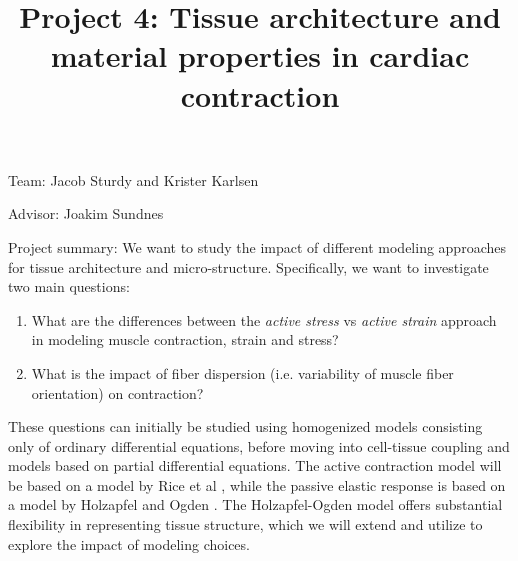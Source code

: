 \documentclass[epsfig,11pt]{article}
\title{Project 4: Tissue architecture and material properties in cardiac contraction}
\begin{document}
\maketitle

\begin{description}
\item{Team:} Jacob Sturdy and Krister Karlsen
\item{Advisor:} Joakim Sundnes

\item{Project summary:}
We want to study the impact of different modeling approaches for tissue architecture and micro-structure. Specifically, we want to investigate two main questions:
\begin{enumerate}
\item What are the differences between the \emph{active stress} vs \emph{active strain} approach in modeling muscle contraction, strain and stress?
\item What is the impact of fiber dispersion (i.e. variability of muscle fiber orientation) on contraction?
\end{enumerate}

These questions can initially be studied using homogenized models consisting only of ordinary differential equations, before moving into cell-tissue coupling and models based on partial differential equations. The active contraction model will be based on a model by Rice et al \cite{Rice:2008jd}, while the passive elastic response is based on a model by Holzapfel and Ogden \cite{Holzapfel:2009bb}. The Holzapfel-Ogden model offers substantial flexibility in representing tissue structure, which we will extend and utilize to explore the impact of modeling choices. 


\end{description}
\end{document}

